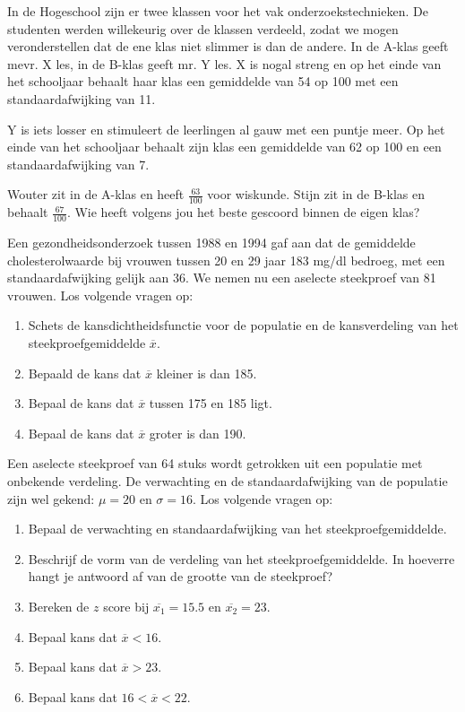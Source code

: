 \begin{exercise}
  In de  Hogeschool zijn er twee klassen voor het vak onderzoekstechnieken. De studenten werden willekeurig over de klassen verdeeld, zodat we mogen veronderstellen dat de ene klas niet slimmer is dan de andere. In de A-klas geeft mevr. X les, in de B-klas geeft mr. Y les. X is nogal streng en op het einde van het schooljaar behaalt haar klas een gemiddelde van 54 op 100 met een standaardafwijking van 11.

  Y is iets losser en stimuleert de leerlingen al gauw met een puntje meer. Op het einde van het schooljaar behaalt zijn klas een gemiddelde van 62 op 100 en een standaardafwijking van 7.

  Wouter zit in de A-klas en heeft $\frac{63}{100}$ voor wiskunde. Stijn zit in de B-klas en behaalt $\frac{67}{100}$. Wie heeft volgens jou het beste gescoord binnen de eigen klas?
\end{exercise}

\begin{exercise}
  Een gezondheidsonderzoek tussen 1988 en 1994 gaf aan dat de gemiddelde cholesterolwaarde bij vrouwen tussen 20 en 29 jaar 183 mg/dl bedroeg, met een standaardafwijking gelijk aan 36. We nemen nu een aselecte steekproef van 81 vrouwen. Los volgende vragen op:

  \begin{enumerate}[label=\alph*.]
    \item Schets de kansdichtheidsfunctie voor de populatie en de kansverdeling van het steekproefgemiddelde $\overline{x}$.
    \item Bepaald de kans dat $\overline{x}$ kleiner is dan 185.
    \item Bepaal de kans dat $\overline{x}$ tussen 175 en 185 ligt.
    \item Bepaal de kans dat $\overline{x}$ groter is dan 190.
  \end{enumerate}
\end{exercise}

\begin{exercise}
  Een aselecte steekproef van 64 stuks wordt getrokken uit een populatie met onbekende verdeling. De verwachting en de standaardafwijking van de populatie
  zijn wel gekend: $\mu = 20$ en $\sigma=16$. Los volgende vragen op:

  \begin{enumerate}[label=\alph*.]
    \item Bepaal de verwachting en standaardafwijking van het steekproefgemiddelde.
    \item Beschrijf de vorm van de verdeling van het steekproefgemiddelde. In hoeverre hangt je antwoord af van de grootte van de steekproef?
    \item Bereken de $z$ score bij $\overline{x_{1}} = 15.5$ en $\overline{x_{2}} = 23$.
    \item Bepaal kans dat $\overline{x} <16$.
    \item Bepaal kans dat $\overline{x} > 23$.
    \item Bepaal kans dat $16< \overline{x}< 22$.
  \end{enumerate}
\end{exercise}

